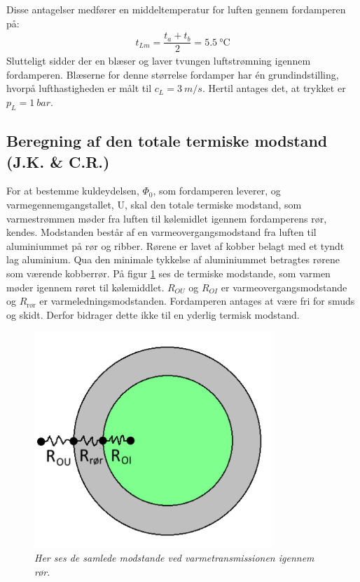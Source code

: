 \documentclass[../Hovedrapport.tex]{subfiles}
\begin{document}
Disse antagelser medfører en middeltemperatur for luften gennem fordamperen på:
\begin{align}
    t_{Lm}= \dfrac{t_{a}+t_{b}}{2} = \SI{5,5}{\celsius} %
\end{align}
Slutteligt sidder der en blæser og laver tvungen luftstrømning igennem fordamperen. Blæserne for denne størrelse fordamper har én grundindstilling, hvorpå lufthastigheden er målt til $c_{\textit{{L}}}= \SI{3}{m/s}$. Hertil antages det, at trykket er $p_{\textit{{L}}}= \SI{1}{bar}$.


\subsection{Beregning af den totale termiske modstand  (J.K. \& C.R.)}
    \label{sec:Beregning_af_den_totale_varmeovergangsmodstand1}

\begin{minipage}[t]{0.58\textwidth}
For at  bestemme kuldeydelsen, $\si{\Phi_0}$, som fordamperen leverer, og varmegennemgangstallet, U, skal den totale termiske modstand, som varmestrømmen møder fra luften til kølemidlet igennem fordamperens rør, kendes. Modstanden består af en varmeovergangsmodstand fra luften til aluminiummet på rør og ribber. Rørene er lavet af kobber belagt med et tyndt lag aluminium. Qua den minimale tykkelse af aluminiummet betragtes rørene som værende kobberrør. På figur \ref{fig:modstande_i_roer} ses de termiske modstande, som varmen møder igennem røret til kølemiddlet. $R_{OU}$ og $R_{OI}$ er varmeovergangsmodstande og $R_{\text{rør}}$ er varmeledningsmodstanden. Fordamperen antages at være fri for smuds og skidt. Derfor bidrager dette ikke til en yderlig termisk modstand.
\end{minipage} \hfill
\begin{minipage}[t]{0.4\textwidth}
\begin{figure}[H]
    \centering
   \includegraphics[width=0.8\textwidth]{Billeder/Modstande.png}
    \caption{\textit{Her ses de samlede modstande ved varmetransmissionen igennem rør}.}
    \label{fig:modstande_i_roer}
\end{figure}
\end{minipage}
\end{document}
